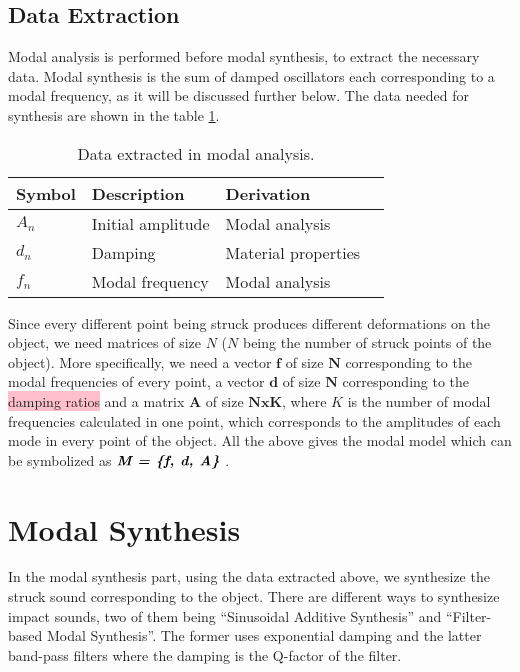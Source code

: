 \subsection{Data Extraction}\label{sec:data_extract}
Modal analysis is performed before modal synthesis, to extract the necessary data. Modal synthesis is the sum of damped oscillators each corresponding to a modal frequency, as it will be discussed further below. The data needed for synthesis are shown in the table \ref{tab:extracted_data}.

\begin{table}
	\centering
    \begin{tabular}{ | l | l | l | p{5cm} |}
    \hline
    \textbf{Symbol} & \textbf{Description} & \textbf{Derivation} \\ \hline
    $A_n$ & Initial amplitude & Modal analysis \\ \hline
    $d_n$ & Damping & Material properties \\ \hline
    $f_n$ & Modal frequency & Modal analysis \\
    \hline
    \end{tabular}
    \caption{Data extracted in modal analysis.}
    \label{tab:extracted_data}
\end{table} 

Since every different point being struck produces different deformations on the object, we need matrices of size $N$ ($N$ being the number of struck points of the object). More specifically, we need a vector $\textbf{f}$ of size $\textbf{N}$ corresponding to the modal frequencies of every point, a vector $\textbf{d}$ of size $\textbf{N}$ corresponding to the \colorbox{pink}{damping ratios} and a matrix $\textbf{A}$ of size $\textbf{NxK}$, where $K$ is the number of modal frequencies calculated in one point, which corresponds to the amplitudes of each mode in every point of the object. All the above gives the modal model which can be symbolized as $\textbf{\textit{M = \{f, d, A\}}}$ \cite{van2001foleyautomatic}.
 
\section{Modal Synthesis}\label{sec:modal_synth}
In the modal synthesis part, using the data extracted above, we synthesize the struck sound corresponding to the object. There are different ways to synthesize impact sounds, two of them being ``Sinusoidal Additive Synthesis'' and ``Filter-based Modal Synthesis''. The former uses exponential damping and the latter band-pass filters where the damping is the Q-factor of the filter. 

